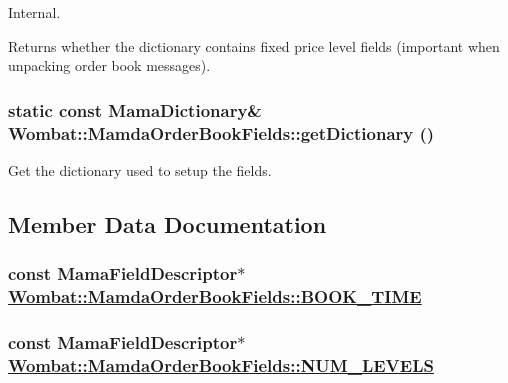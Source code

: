 Internal. 

Returns whether the dictionary contains fixed price level fields (important when unpacking order book messages). \hypertarget{classWombat_1_1MamdaOrderBookFields_beff72a3c0730d7cbb55bcc717af13cc}{
\subsubsection[getDictionary]{\setlength{\rightskip}{0pt plus 5cm}static const Mama\-Dictionary\& Wombat::Mamda\-Order\-Book\-Fields::get\-Dictionary ()}}
\label{classWombat_1_1MamdaOrderBookFields_beff72a3c0730d7cbb55bcc717af13cc}


Get the dictionary used to setup the fields. 



\subsection{Member Data Documentation}
\hypertarget{classWombat_1_1MamdaOrderBookFields_04859b3d0adfbde9261497ede9bb50a8}{
\subsubsection[BOOK\_\-TIME]{\setlength{\rightskip}{0pt plus 5cm}const Mama\-Field\-Descriptor$\ast$ \hyperlink{classWombat_1_1MamdaOrderBookFields_04859b3d0adfbde9261497ede9bb50a8}{Wombat::Mamda\-Order\-Book\-Fields::BOOK\_\-TIME}}}
\label{classWombat_1_1MamdaOrderBookFields_04859b3d0adfbde9261497ede9bb50a8}


\hypertarget{classWombat_1_1MamdaOrderBookFields_3ad71b502d9479a0fa06734e43e4bfd2}{
\subsubsection[NUM\_\-LEVELS]{\setlength{\rightskip}{0pt plus 5cm}const Mama\-Field\-Descriptor$\ast$ \hyperlink{classWombat_1_1MamdaOrderBookFields_3ad71b502d9479a0fa06734e43e4bfd2}{Wombat::Mamda\-Order\-Book\-Fields::NUM\_\-LEVELS}}}
\label{classWombat_1_1MamdaOrderBookFields_3ad71b502d9479a0fa06734e43e4bfd2}


